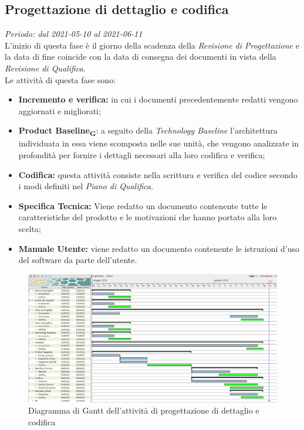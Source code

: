 \subsection{Progettazione di dettaglio e codifica}
\textit{Periodo: dal 2021-05-10 al 2021-06-11}\\
L’inizio di questa fase è il giorno della scadenza della \textit{Revisione di Progettazione} e la data di fine coincide con la data di consegna dei documenti in vista della \textit{Revisione di Qualifica}.\\
Le attività di questa fase sono:
\begin {itemize}
\item \textbf{Incremento e verifica:} in cui i documenti precedentemente redatti vengono aggiornati e migliorati;
\item \textbf{Product Baseline\textsubscript{\textbf{G}}}: a seguito della \textit{Technology Baseline} l’architettura individuata in essa viene scomposta nelle sue unità, che vengono analizzate in profondità per fornire i dettagli necessari alla loro codifica e verifica;
\item \textbf{Codifica:} questa attività consiste nella scrittura e verifica del codice secondo i modi definiti nel \textit{Piano di Qualifica}.
\item \textbf{Specifica Tecnica:} Viene redatto un documento contenente tutte le caratteristiche del prodotto e le motivazioni che hanno portato alla loro scelta;
\item \textbf{Manuale Utente:} viene redatto un documento contenente le istruzioni d'uso del software da parte dell'utente.
\end {itemize}
\begin{figure}[!ht]
    \caption{Diagramma di Gantt dell’attività di progettazione di dettaglio e codifica}
    \vspace{5px}
    \includegraphics[scale=0.22]{../../../Images/Diagrammi/Gantt/progettazioneCodifica.png}
    \centering
\end{figure}

